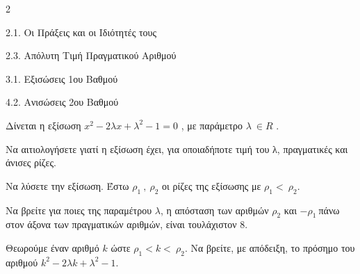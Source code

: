 \begin{ylh}{2}
    \item 2.1. Οι Πράξεις και οι Ιδιότητές τους
    \item 2.3. Απόλυτη Τιμή Πραγματικού Αριθμού
    \item 3.1. Εξισώσεις 1ου Βαθμού
    \item 4.2. Ανισώσεις 2ου Βαθμού
\end{ylh}
Δίνεται η εξίσωση $x^{2} - 2\lambda x + \lambda^{2} - 1 = 0$ , με παράμετρο $\lambda\  \in R$ .

\begin{alist}
\item Να αιτιολογήσετε γιατί η εξίσωση έχει, για οποιαδήποτε τιμή του λ, πραγματικές και άνισες ρίζες.
\item Να λύσετε την εξίσωση.
Έστω $\rho_{1}\ ,\ \rho_{2}$ οι ρίζες της εξίσωσης με $\rho_{1} < \ \rho_{2}$.

\item Να βρείτε για ποιες της παραμέτρου $\lambda$, η απόσταση των αριθμών $\rho_{2}$ και ${- \rho}_{1}\ $πάνω στον άξονα των πραγματικών αριθμών, είναι τουλάχιστον 8.
\item Θεωρούμε έναν αριθμό $k$ ώστε $\rho_{1} < k < \ \rho_{2}$. Να βρείτε, με απόδειξη, το πρόσημο του αριθμού $k^{2} - 2\lambda k + \lambda^{2} - 1$.
\end{alist}

